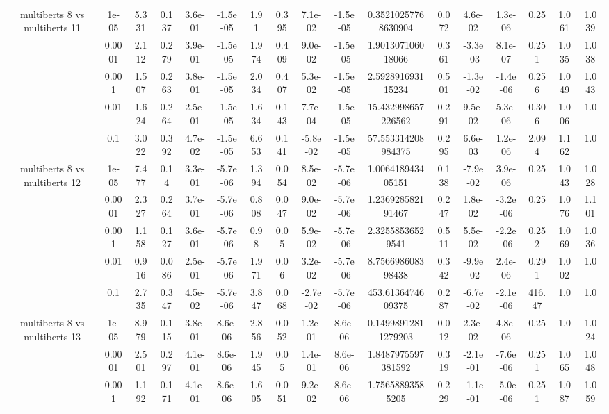\begin{tabular}{|c|c|c|c|c|c|c|c|c|c|c|c|c|c|c|c|c|}
\hline
\multirow{5}{*}{multiberts 8 vs multiberts 11} & 1e-05 & 5.331 & 0.137 & 3.6e-01 & -1.5e-05 & 1.91 & 0.395 & 7.1e-02 & -1.5e-05 & 0.35210257768630904 & 0.072 & 4.6e-02 & 1.3e-06 & 0.25 & 1.061 & 1.039 \\
 & 0.0001 & 2.112 & 0.279 & 3.9e-01 & -1.5e-05 & 1.974 & 0.409 & 9.0e-02 & -1.5e-05 & 1.901307106018066 & 0.361 & -3.3e-03 & 8.1e-07 & 0.251 & 1.035 & 1.038 \\
 & 0.001 & 1.507 & 0.263 & 3.8e-01 & -1.5e-05 & 2.034 & 0.407 & 5.3e-02 & -1.5e-05 & 2.592891693115234 & 0.501 & -1.3e-02 & -1.4e-06 & 0.256 & 1.049 & 1.043 \\
 & 0.01 & 1.624 & 0.264 & 2.5e-01 & -1.5e-05 & 1.634 & 0.143 & 7.7e-04 & -1.5e-05 & 15.432998657226562 & 0.291 & 9.5e-02 & 5.3e-06 & 0.306 & 1.006 & 1.0 \\
 & 0.1 & 3.022 & 0.392 & 4.7e-02 & -1.5e-05 & 6.653 & 0.141 & -5.8e-02 & -1.5e-05 & 57.553314208984375 & 0.295 & 6.6e-03 & 1.2e-06 & 2.094 & 1.162 & 1.0 \\
\hline
\multirow{5}{*}{multiberts 8 vs multiberts 12} & 1e-05 & 7.477 & 0.14 & 3.3e-01 & -5.7e-06 & 1.394 & 0.054 & 8.5e-02 & -5.7e-06 & 1.006418943405151 & 0.138 & -7.9e-02 & 3.9e-06 & 0.25 & 1.043 & 1.028 \\
 & 0.0001 & 2.327 & 0.264 & 3.7e-01 & -5.7e-06 & 0.808 & 0.047 & 9.0e-02 & -5.7e-06 & 1.236928582191467 & 0.247 & 1.8e-02 & -3.2e-06 & 0.25 & 1.076 & 1.101 \\
 & 0.001 & 1.158 & 0.127 & 3.6e-01 & -5.7e-06 & 0.98 & 0.05 & 5.9e-02 & -5.7e-06 & 2.32558536529541 & 0.511 & 5.5e-02 & -2.2e-06 & 0.252 & 1.069 & 1.036 \\
 & 0.01 & 0.916 & 0.086 & 2.5e-01 & -5.7e-06 & 1.971 & 0.06 & 3.2e-02 & -5.7e-06 & 8.756698608398438 & 0.342 & -9.9e-02 & 2.4e-06 & 0.291 & 1.002 & 1.0 \\
 & 0.1 & 2.735 & 0.347 & 4.5e-02 & -5.7e-06 & 3.847 & 0.068 & -2.7e-02 & -5.7e-06 & 453.6136474609375 & 0.287 & -6.7e-02 & -2.1e-06 & 416.47 & 1.0 & 1.0 \\
\hline
\multirow{5}{*}{multiberts 8 vs multiberts 13} & 1e-05 & 8.979 & 0.115 & 3.8e-01 & 8.6e-06 & 2.856 & 0.052 & 1.2e-01 & 8.6e-06 & 0.14998912811279203 & 0.012 & 2.3e-02 & 4.8e-06 & 0.25 & 1.0 & 1.024 \\
 & 0.0001 & 2.501 & 0.297 & 4.1e-01 & 8.6e-06 & 1.945 & 0.05 & 1.4e-01 & 8.6e-06 & 1.8487975597381592 & 0.319 & -2.1e-01 & -7.6e-06 & 0.251 & 1.065 & 1.048 \\
 & 0.001 & 1.192 & 0.171 & 4.1e-01 & 8.6e-06 & 1.605 & 0.051 & 9.2e-02 & 8.6e-06 & 1.75658893585205 & 0.229 & -1.1e-01 & -5.0e-06 & 0.251 & 1.087 & 1.059 \\

\end{tabular}

